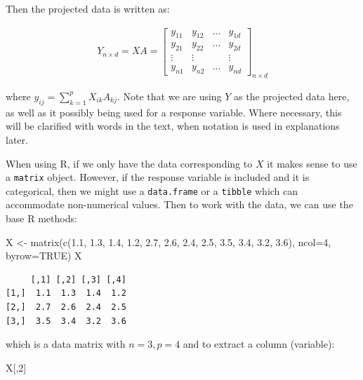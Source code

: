 \documentclass[
  letterpaper,
]{krantz}
\newenvironment{Shaded}{\begin{snugshade}}{\end{snugshade}}
\newcommand{\AttributeTok}[1]{\textcolor[rgb]{0.40,0.45,0.13}{#1}}
\newcommand{\ConstantTok}[1]{\textcolor[rgb]{0.56,0.35,0.01}{#1}}
\newcommand{\DecValTok}[1]{\textcolor[rgb]{0.68,0.00,0.00}{#1}}
\newcommand{\FloatTok}[1]{\textcolor[rgb]{0.68,0.00,0.00}{#1}}
\newcommand{\FunctionTok}[1]{\textcolor[rgb]{0.28,0.35,0.67}{#1}}
\newcommand{\NormalTok}[1]{\textcolor[rgb]{0.00,0.23,0.31}{#1}}
\newcommand{\OtherTok}[1]{\textcolor[rgb]{0.00,0.23,0.31}{#1}}
\begin{document}
Then the projected data is written as:

\begin{eqnarray*}
Y_{n\times d} = XA = \left[ \begin{array}{cccc}
y_{11} & y_{12} & \dots & y_{1d} \\
y_{21} & y_{22} & \dots & y_{2d}\\
\vdots & \vdots &  & \vdots \\
y_{n1} & y_{n2} & \dots & y_{nd} \end{array} \right]_{n\times d}
\end{eqnarray*}

where \(y_{ij} = \sum_{k=1}^p X_{ik}A_{kj}\). Note that we are using
\(Y\) as the projected data here, as well as it possibly being used for
a response variable. Where necessary, this will be clarified with words
in the text, when notation is used in explanations later.

When using R, if we only have the data corresponding to \(X\) it makes
sense to use a \texttt{matrix} object. However, if the response variable
is included and it is categorical, then we might use a
\texttt{data.frame} or a \texttt{tibble} which can accommodate
non-numerical values. Then to work with the data, we can use the base R
methods:

\begin{Shaded}
\begin{Highlighting}[]
\NormalTok{X }\OtherTok{\textless{}{-}} \FunctionTok{matrix}\NormalTok{(}\FunctionTok{c}\NormalTok{(}\FloatTok{1.1}\NormalTok{, }\FloatTok{1.3}\NormalTok{, }\FloatTok{1.4}\NormalTok{, }\FloatTok{1.2}\NormalTok{, }
              \FloatTok{2.7}\NormalTok{, }\FloatTok{2.6}\NormalTok{, }\FloatTok{2.4}\NormalTok{, }\FloatTok{2.5}\NormalTok{, }
              \FloatTok{3.5}\NormalTok{, }\FloatTok{3.4}\NormalTok{, }\FloatTok{3.2}\NormalTok{, }\FloatTok{3.6}\NormalTok{), }
            \AttributeTok{ncol=}\DecValTok{4}\NormalTok{, }\AttributeTok{byrow=}\ConstantTok{TRUE}\NormalTok{)}
\NormalTok{X}
\end{Highlighting}
\end{Shaded}

\begin{verbatim}
     [,1] [,2] [,3] [,4]
[1,]  1.1  1.3  1.4  1.2
[2,]  2.7  2.6  2.4  2.5
[3,]  3.5  3.4  3.2  3.6
\end{verbatim}

which is a data matrix with \(n=3, p=4\) and to extract a column
(variable):

\begin{Shaded}
\begin{Highlighting}[]
\NormalTok{X[,}\DecValTok{2}\NormalTok{]}
\end{Highlighting}
\end{Shaded}
\end{document}
